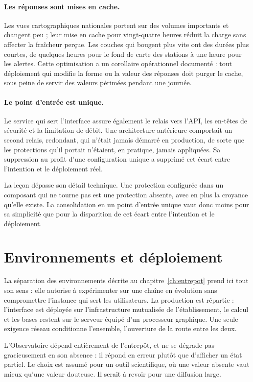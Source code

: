 \paragraph{Les réponses sont mises en cache.} Les vues cartographiques nationales portent sur
des volumes importants et changent peu ; leur mise en cache pour vingt-quatre heures réduit la
charge sans affecter la fraîcheur perçue. Les couches qui bougent plus vite ont des durées plus
courtes, de quelques heures pour le fond de carte des stations à une heure pour les alertes. Cette optimisation a un corollaire opérationnel
documenté : tout déploiement qui modifie la forme ou la valeur des réponses doit purger le
cache, sous peine de servir des valeurs périmées pendant une journée.

\paragraph{Le point d'entrée est unique.} Le service qui sert l'interface assure également le
relais vers l'API, les en-têtes de sécurité et la limitation de débit. Une architecture
antérieure comportait un second relais, redondant, qui n'était jamais démarré en production,
de sorte que les protections qu'il portait n'étaient, en pratique, jamais appliquées. Sa
suppression au profit d'une configuration unique a supprimé cet écart entre l'intention et le
déploiement réel.

La leçon dépasse son détail technique. Une protection configurée dans un composant qui ne tourne
pas est une protection absente, avec en plus la croyance qu'elle existe. La consolidation en un
point d'entrée unique vaut donc moins pour sa simplicité que pour la disparition de cet écart
entre l'intention et le déploiement.

\section{Environnements et déploiement}

La séparation des environnements décrite au chapitre~\ref{ch:entrepot} prend ici tout son sens :
elle autorise à expérimenter sur une chaîne en évolution sans compromettre l'instance qui sert
les utilisateurs. La production est répartie : l'interface est déployée sur l'infrastructure
mutualisée de l'établissement, le calcul et les bases restent sur le serveur équipé d'un
processeur graphique. Une seule exigence réseau conditionne l'ensemble, l'ouverture de la route
entre les deux.

L'Observatoire dépend entièrement de l'entrepôt, et ne se dégrade pas gracieusement en son
absence : il répond en erreur plutôt que d'afficher un état partiel. Le choix est assumé pour un
outil scientifique, où une valeur absente vaut mieux qu'une valeur douteuse. Il serait à revoir
pour une diffusion large.
